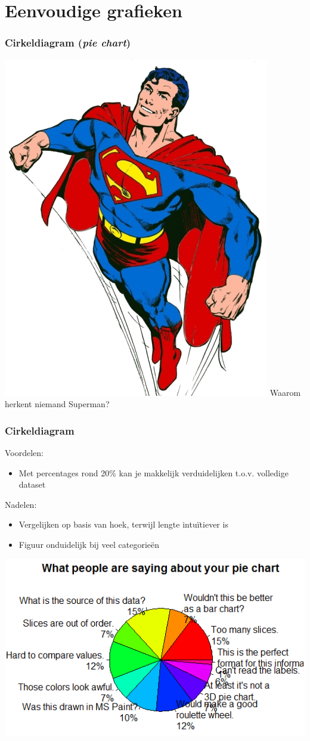 \documentclass{beamer}
\begin{document}
\begin{frame}[plain]

\end{frame}

\section{Eenvoudige grafieken}
\sectionframelogo{}

\begin{frame}
  \frametitle{Cirkeldiagram (\emph{pie chart})}

  \centering
  \includegraphics[width=.8cm]{img/les2-hero-3}
  Waarom herkent niemand Superman?

\end{frame}

\begin{frame}
  \frametitle{Cirkeldiagram}

  Voordelen:
  \begin{itemize}
    \item Met percentages rond 20\% kan je makkelijk verduidelijken t.o.v. volledige dataset
  \end{itemize}
  Nadelen:
  \begin{itemize}
    \item Vergelijken op basis van hoek, terwijl lengte intuïtiever is
    \item Figuur onduidelijk bij veel categorieën
  \end{itemize}

  \begin{center}

  \includegraphics[width=.6\textwidth]{img/pie-chart.png}
  \end{center}

\end{frame}
\end{document}
